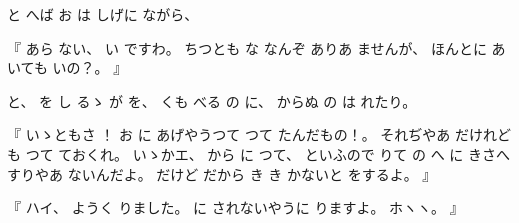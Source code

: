 %
と
へば
お
は
しげに
ながら、

%
『
あら
ない、
%
い
ですわ。
%
ちつとも
な
なんぞ
ありあ
ませんが、
%
ほんとに
あ
いても%
いの？。
』

%
と、
%
を
し
るゝ%
が
を、
%
くも
べる
の
に、
%
からぬ
の
は%
れたり。

%
『
いゝともさ%
！\inhibitglue{}%
お
に
あげやうつて
つて
たんだもの！。
%
それぢやあ
だけれども
つて
ておくれ。
%
いゝかエ、%
%
から%
に%
つて、
%
といふので
りて
の
へ
に
きさへすりやあ
ないんだよ。
%
だけど
だから
き
き%
かないと
をするよ。
』

%
『
ハイ、
%
ようく
りました。
%
に
されないやうに
りますよ。
%
ホヽヽ。
』

